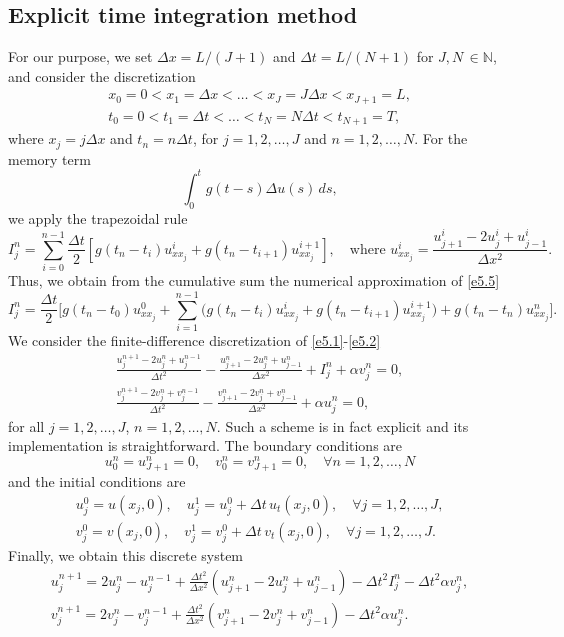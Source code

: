 \documentclass[reqno]{amsart}
\begin{document}
\subsection{Explicit time integration method}
 For our purpose, we set
$\Delta x = L/(J+1)$ and $\Delta t = L/(N+1)$ for $ J,N \, \in \mathbb{N}$,
and consider the  discretization
\begin{gather*}
x_0 = 0 < x_1 = \Delta x < \dots < x_J = J\Delta x < x_{J+1} = L, \\
t_0 = 0 < t_1 = \Delta t < \dots < t_N = N\Delta t < t_{N+1} = T,
\end{gather*}
where $x_j= j \Delta x$ and $t_n= n \Delta t$, for $j=1, 2 , \dots ,J$ and
$n=1, 2 , \dots ,N$.  For the memory term
\[
\int_0^t g(t - s) \Delta u(s) \, ds, \label{e5.5}
\]
we apply the trapezoidal rule
\[
I_j^n = \sum_{i=0}^{n-1}\frac{\Delta t}{2}
\left[ g(t_n - t_i) u_{{xx}_j}^i + g(t_n - t_{i+1}) u_{{xx}_j}^{i+1} \right],\quad
\text{where }  u_{{xx}_j}^i = \frac{u_{j+1}^i - 2u_j^i + u_{j-1}^i }{\Delta x^2}.
\]
Thus, we obtain from the cumulative sum the numerical approximation of \eqref{e5.5}
$$
I_j^n = \frac{\Delta t}{2} \Big[ g(t_n - t_0) u_{{xx}_j}^0
+ \sum_{i=1}^{n-1} \Big( g(t_n - t_i) u_{{xx}_j}^i + g(t_n - t_{i+1}) u_{{xx}_j}^{i+1}
\Big) + g(t_n - t_n) u_{{xx}_j}^n \Big].
$$
We consider the  finite-difference discretization
of \eqref{e5.1}-\eqref{e5.2}
\begin{gather}
\frac{u_j^{n+1} - 2u_j^n + u_j^{n-1}}{\Delta t^2} - \frac{u_{j+1}^n
 - 2u_j^n + u_{j-1}^n}{\Delta x^2} + I_j^n + \alpha v_j^n = 0, \label{e5.6} \\
\frac{v_j^{n+1} - 2v_j^n + v_j^{n-1}}{\Delta t^2} - \frac{v_{j+1}^n
- 2v_j^n + v_{j-1}^n}{\Delta x^2} + \alpha u_j^n = 0, \label{e5.7}
\end{gather}
for all $j = 1, 2, \dots, J$, $n = 1, 2, \dots , N$.
Such a scheme is in fact explicit and its implementation is straightforward.
The boundary conditions are
\begin{equation}
u_0^n = u_{J+1}^n = 0, \quad v_0^n = v_{J+1}^n = 0, \quad
\forall n = 1, 2, \dots, N \label{e5.8}
\end{equation}
and the initial conditions are
\begin{gather}
u_j^0 = u(x_j, 0), \quad u_j^1 = u_j^0 + \Delta t \, u_t(x_j, 0), \quad
 \forall j = 1, 2, \dots, J, \label{e5.9} \\
v_j^0 = v(x_j, 0), \quad v_j^1 = v_j^0 + \Delta t \, v_t(x_j, 0), \quad
\forall j = 1, 2, \dots, J. \label{e5.10}
\end{gather}
Finally, we obtain this discrete system
\begin{gather*}
u_j^{n+1} = 2u_j^n - u_j^{n-1} + \frac{\Delta t^2}{\Delta x^2} \left( u_{j+1}^n
 - 2u_j^n + u_{j-1}^n \right) - \Delta t^2 I_j^n - \Delta t^2 \alpha v_j^n,\\
v_j^{n+1} = 2v_j^n - v_j^{n-1} + \frac{\Delta t^2}{\Delta x^2} \left( v_{j+1}^n
 - 2v_j^n + v_{j-1}^n \right) - \Delta t^2 \alpha u_j^n.
\end{gather*}
\end{document}
